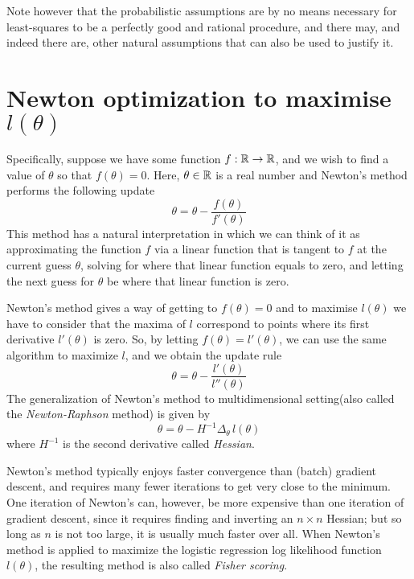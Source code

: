 Note however that the probabilistic assumptions are by no means necessary for least-squares to be 
a perfectly good and rational procedure, and there may, and indeed there are, other natural assumptions
that can also be used to justify it.

\section{Newton optimization to maximise $l(\theta)$}
Specifically, suppose we have some function $f:\mathbb{R} \to \mathbb{R}$, and we wish to find a value of $\theta$
so that $f(\theta) = 0$.\newline
Here, $\theta \in \mathbb{R}$ is a real number and Newton’s method performs the following update
\[ \theta = \theta - \frac{f(\theta)}{f'(\theta)} \]
This method has a natural interpretation in which we can think of it as approximating the function $f$
via a linear function that is tangent to $f$ at the current guess $\theta$, solving for where that 
linear function equals to zero, and letting the next guess for $\theta$ be where that linear function is zero.

Newton’s method gives a way of getting to $f(\theta) = 0$ and to maximise $l(\theta)$ we have to consider that
the maxima of $l$ correspond to points where its first derivative $l'(\theta)$ is zero.\newline
So, by letting $f(\theta) = l'(\theta)$, we can use the same algorithm to maximize $l$, and we obtain the update rule
\[ \theta = \theta - \frac{l'(\theta)}{l''(\theta)} \]
The generalization of Newton’s method to multidimensional setting(also called the \emph{Newton-Raphson} method)
is given by 
\[ \theta = \theta - H^{-1} \Delta _{\theta} \, l(\theta) \]
where $H^{-1}$ is the second derivative called \emph{Hessian}.

Newton’s method typically enjoys faster convergence than (batch) gradient descent, and requires
many fewer iterations to get very close to the minimum.\newline
One iteration of Newton’s can, however, be more expensive than one iteration of gradient descent,
since it requires finding and inverting an $n \times n$ Hessian; but so long as $n$ is not too large,
it is usually much faster over all.\newline
When Newton’s method is applied to maximize the logistic regression log likelihood function $l(\theta)$,
the resulting method is also called \emph{Fisher scoring}.

